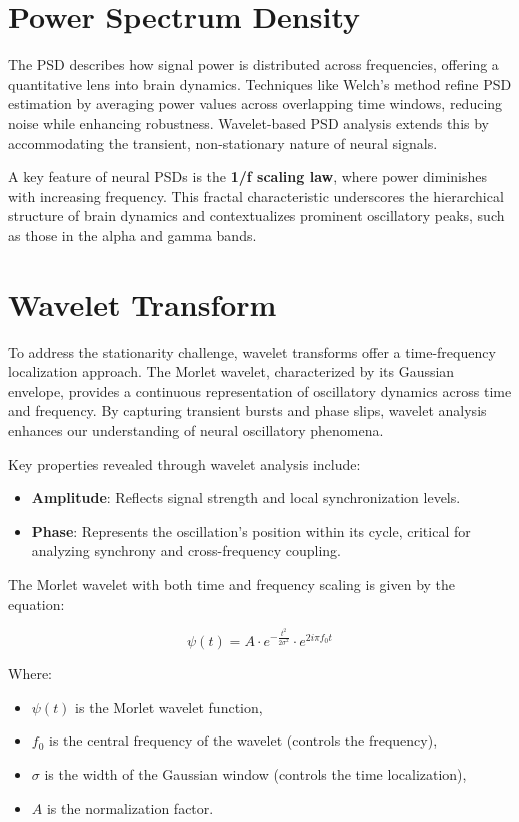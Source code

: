 \section{Power Spectrum Density}
The PSD describes how signal power is distributed across frequencies, offering a quantitative lens into brain dynamics. Techniques like Welch's method refine PSD estimation by averaging power values across overlapping time windows, reducing noise while enhancing robustness. Wavelet-based PSD analysis extends this by accommodating the transient, non-stationary nature of neural signals. 

A key feature of neural PSDs is the \textbf{1/f scaling law}, where power diminishes with increasing frequency. This fractal characteristic underscores the hierarchical structure of brain dynamics and contextualizes prominent oscillatory peaks, such as those in the alpha and gamma bands.

\section{Wavelet Transform}
To address the stationarity challenge, wavelet transforms offer a time-frequency localization approach. The Morlet wavelet, characterized by its Gaussian envelope, provides a continuous representation of oscillatory dynamics across time and frequency. By capturing transient bursts and phase slips, wavelet analysis enhances our understanding of neural oscillatory phenomena. 

Key properties revealed through wavelet analysis include:
\begin{itemize}
\item \textbf{Amplitude}: Reflects signal strength and local synchronization levels.
\item \textbf{Phase}: Represents the oscillation's position within its cycle, critical for analyzing synchrony and cross-frequency coupling.
\end{itemize}

The Morlet wavelet with both time and frequency scaling is given by the equation:

$$
\psi(t) = A \cdot e^{-\frac{t^2}{2\sigma^2}} \cdot e^{2i \pi f_0 t} 
$$

Where:
\begin{itemize}
  \item \( \psi(t) \) is the Morlet wavelet function,
  \item \( f_0 \) is the central frequency of the wavelet (controls the frequency),
  \item \( \sigma \) is the width of the Gaussian window (controls the time localization),
  \item \( A \) is the normalization factor.
\end{itemize}



